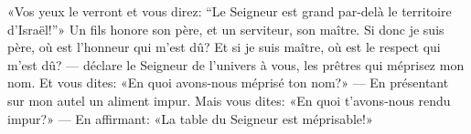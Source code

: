 «Vos yeux le verront et vous direz:
	“Le Seigneur est grand par-delà le territoire d’Israël!”»
Un fils honore son père, et un serviteur, son maître.
	Si donc je suis père, où est l’honneur qui m’est dû?
	Et si je suis maître, où est le respect qui m’est dû?
	--- déclare le Seigneur de l’univers à vous, les prêtres qui méprisez mon nom.
Et vous dites:
	«En quoi avons-nous méprisé ton nom?»
	--- En présentant sur mon autel un aliment impur.
Mais vous dites:
	«En quoi t’avons-nous rendu impur?»
	--- En affirmant: «La table du Seigneur est méprisable!»
